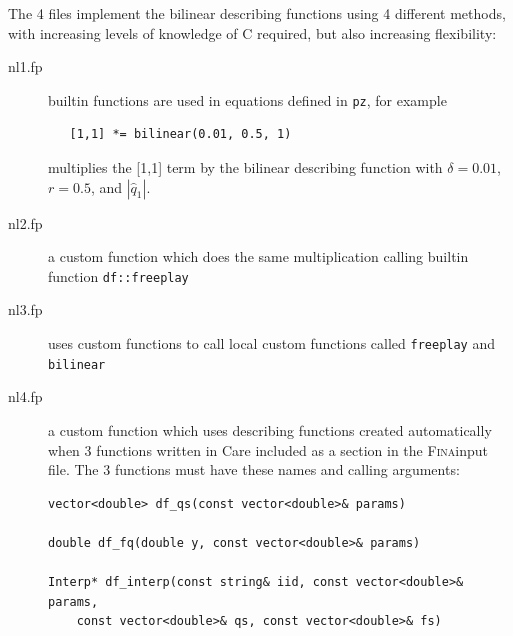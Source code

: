 \documentclass[10pt,openany,twoside]{book}
\numberwithin{equation}{section}   %
\def\Cpp{{C\nolinebreak[4]\hspace{-.05em}\raisebox{.4ex}{\tiny\bf ++}}\:}
\newcommand{\Code}[1]{{\small\tt #1}}
\newcommand{\Fina}{{\normalfont\scshape Fina\:}}
\newcommand{\Matrix}[1]{\boldsymbol{#1}}
\newcommand{\Vector}[1]{\boldsymbol{#1}}
\begin{document}
The 4 files implement the bilinear describing functions using 4
different methods, with increasing levels of knowledge of \Cpp
required, but also increasing flexibility:
\begin{description}
\item[nl1.fp] builtin functions are used in equations defined in
\Code{pz}, for example
\begin{lstlisting}
   [1,1] *= bilinear(0.01, 0.5, 1)
\end{lstlisting}
multiplies the [1,1] term by the bilinear describing function with
$\delta=0.01$, $r = 0.5$, and $|\hat{q}_1|$.

\item[nl2.fp] a custom function which does the same multiplication
calling builtin function \Code{df::freeplay}

\item[nl3.fp] uses custom functions to call local custom functions
called \Code{freeplay} and \Code{bilinear}

\item[nl4.fp] a custom function which uses describing functions
created automatically when 3 functions written in \Cpp are included as
a section in the \Fina input file. The 3 functions must have these names and
calling arguments:
	\begin{lstlisting}
vector<double> df_qs(const vector<double>& params)

double df_fq(double y, const vector<double>& params)

Interp* df_interp(const string& iid, const vector<double>& params,
    const vector<double>& qs, const vector<double>& fs)
	\end{lstlisting}

\end{description}
\end{document}
